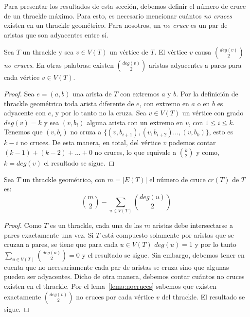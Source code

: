     Para presentar los resultados de esta sección, debemos definir el número de cruce de un thrackle
    máximo. Para esto, es necesario mencionar cuántos \emph{no cruces} existen en un thrackle
    geométrico. Para nosotros, un \emph{no cruce} es un par de aristas que son adyacentes
    entre sí.

    \begin{lemma} \label{lema:nocruces}
      Sea $T$ un thrackle y sea $v\in V(T)$ un vértice de $T$. El vértice $v$ causa
      $\binom{deg(v)}{2}$ \emph{no cruces}. En otras palabras: existen $\binom{deg(v)}{2}$ aristas
      adyacentes a pares para cada vértice $v\in V(T)$.
    \end{lemma}
    \begin{proof}
      Sea $e=(a,b)$ una arista de $T$ con extremos $a$ y $b$. Por la definición de thrackle
      geométrico toda arista diferente de $e$, con extremo en $a$ o en $b$ es adyacente con
      $e$, y por lo tanto no la cruza. Sea $v\in V(T)$ un vértice con grado $deg(v)=k$ y sea
      $(v,b_i)$ alguna arista con un extremo en $v$, con $1 \leq i \leq k$. Tenemos que $(v,b_i)$
      no cruza a $\{(v,b_{i+1}),(v,b_{i+2})\dots,(v,b_k)\}$, esto es $k-i$ no cruces.
      De esta manera, en total, del vértice $v$ podemos contar $(k-1)+(k-2)+\dots+0$ no cruces, lo
      que equivale a $\binom{k}{2}$ y como, $k=deg(v)$ el resultado se sigue.
    \end{proof}

    \begin{theorem} \label{teorema:cn_thrackle}
      Sea $T$ un thrackle geométrico, con $m=|E({T})|$ el número de cruce $cr({T})$ de ${T}$ es:
      \[
        \binom{m}{2} - \sum_{u \in V({T})} \binom{deg(u)}{2}
      \]
    \end{theorem}
    \begin{proof}
      Como $T$ es un thrackle, cada una de las $m$ aristas debe intersectarse a pares
      exactamente una vez. Si ${T}$ está compuesto solamente por aristas que se cruzan a pares,
      se tiene que para cada $u\in V({T})$ $deg(u)=1$ y por lo tanto $\sum_{u \in V({T})}
      \binom{deg(u)}{2} = 0$ y el resultado se sigue. Sin embargo, debemos tener en cuenta
      que no necesariamente cada par de aristas se cruza sino que algunas pueden ser
      adyacentes. Dicho de otra manera, debemos contar cuántos no cruces existen en el
      thrackle. Por el lema~\ref{lema:nocruces} sabemos que existen exactamente
      $\binom{deg(v)}{2}$ no cruces por cada vértice $v$ del thrackle. El resultado se sigue.
    \end{proof}

